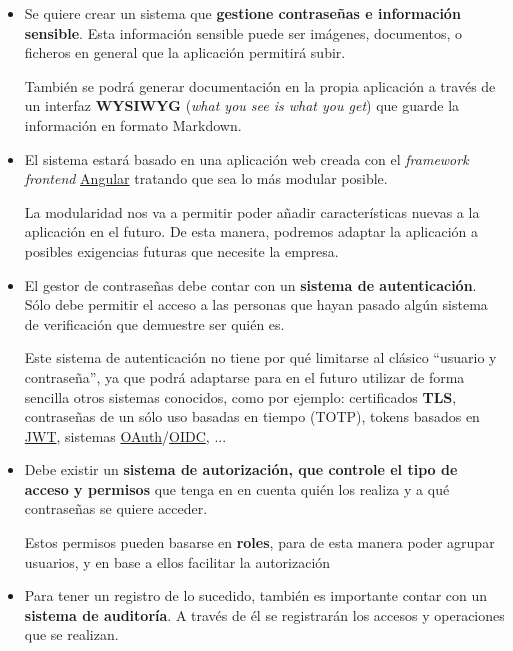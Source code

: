 \documentclass{\ClassPath/viu-tfm-template}
\begin{document}
\begin{itemize}

    \item Se quiere crear un sistema que \textbf{gestione contraseñas e información sensible}. Esta información sensible puede ser imágenes, documentos, o ficheros en general que la aplicación permitirá subir.

    También se podrá generar documentación en la propia aplicación a través de un interfaz \textbf{WYSIWYG} (\textit{what you see is what you get}) que guarde la información en formato Markdown.

    \item El sistema estará basado en una aplicación web creada con el \textit{framework frontend} \href{https://angular.io/}{Angular} tratando que sea lo más modular posible.

    La modularidad nos va a permitir poder añadir características nuevas a la aplicación en el futuro. De esta manera, podremos adaptar la aplicación a posibles exigencias futuras que necesite la empresa.

    \item El gestor de contraseñas debe contar con un \textbf{sistema de autenticación}. Sólo debe permitir el acceso a las personas que hayan pasado algún sistema de verificación que demuestre ser quién es.

    Este sistema de autenticación no tiene por qué limitarse al clásico “usuario y contraseña”, ya que podrá adaptarse para en el futuro utilizar de forma sencilla otros sistemas conocidos, como por ejemplo: certificados \textbf{TLS}, contraseñas de un sólo uso basadas en tiempo (TOTP), tokens basados en \href{https://en.wikipedia.org/wiki/JSON_Web_Token}{JWT}, sistemas \href{https://en.wikipedia.org/wiki/OAuth}{OAuth}/\href{https://en.wikipedia.org/wiki/OpenID#OpenID_Connect_(OIDC)}{OIDC}, ...

    \item Debe existir un \textbf{sistema de autorización, que controle el tipo de acceso y permisos} que tenga en en cuenta quién los realiza y a qué contraseñas se quiere acceder.

    Estos permisos pueden basarse en \textbf{roles}, para de esta manera poder agrupar usuarios, y en base a ellos facilitar la autorización

    \item Para tener un registro de lo sucedido, también es importante contar con un \textbf{sistema de auditoría}. A través de él se registrarán los accesos y operaciones que se realizan.


\end{itemize}
\end{document}
